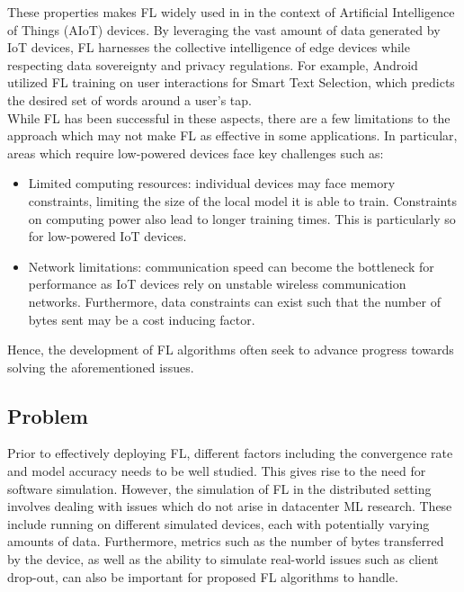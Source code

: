 \documentclass[12pt]{article}
\begin{document}
These properties makes FL widely used in in the context of Artificial Intelligence of Things
(AIoT) devices. By leveraging the vast amount of data generated by IoT devices, FL harnesses the
collective intelligence of edge devices while respecting data sovereignty and privacy
regulations. For example, Android utilized FL training on user interactions for Smart Text Selection,
which predicts the desired set of words around a user's tap\cite{android}.\\

While FL has been successful in these aspects, there are a few limitations to the approach which may
not make FL as effective in some applications. In particular, areas which require low-powered
devices face key challenges such as:
\begin{itemize}
  \item Limited computing resources: individual devices may face memory constraints, limiting the
    size of the local model it is able to train. Constraints on computing power also lead to
    longer training times. This is particularly so for low-powered IoT devices.
  \item Network limitations: communication speed can become the bottleneck for performance as IoT
    devices rely on unstable wireless communication networks. Furthermore, data constraints can
    exist such that the number of bytes sent may be a cost inducing factor.
\end{itemize}

Hence, the development of FL algorithms often seek to advance progress towards solving the
aforementioned issues.

\subsection{Problem}
Prior to effectively deploying FL, different factors including the convergence rate and
model accuracy needs to be well studied. This gives rise to the need for software simulation. However, the
simulation of FL in the distributed setting involves dealing with
issues which do not arise in datacenter ML research. These include running on different simulated
devices, each with potentially varying amounts of data. Furthermore, metrics such as the number of
bytes transferred by the device, as well as the ability to simulate real-world issues such as client
drop-out, can also be important for proposed FL algorithms to handle.
\end{document}
